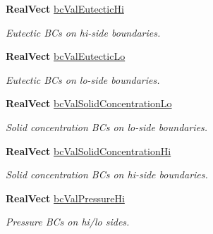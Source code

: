 \begin{DoxyCompactItemize}
\mbox{\label{class_mushy_layer_params_a902bc54e365a674dfb832981ffe4c105}} 
\textbf{ Real\+Vect} \hyperlink{class_mushy_layer_params_a902bc54e365a674dfb832981ffe4c105}{bc\+Val\+Eutectic\+Hi}
\begin{DoxyCompactList}\small\item\em Eutectic B\+Cs on hi-\/side boundaries. \end{DoxyCompactList}\item 
\mbox{\label{class_mushy_layer_params_a7b5ccdd2995d371414f37d7b4817e6b2}} 
\textbf{ Real\+Vect} \hyperlink{class_mushy_layer_params_a7b5ccdd2995d371414f37d7b4817e6b2}{bc\+Val\+Eutectic\+Lo}
\begin{DoxyCompactList}\small\item\em Eutectic B\+Cs on lo-\/side boundaries. \end{DoxyCompactList}\item 
\mbox{\label{class_mushy_layer_params_a6a4304fd045912277d4ddfcbe4fa1736}} 
\textbf{ Real\+Vect} \hyperlink{class_mushy_layer_params_a6a4304fd045912277d4ddfcbe4fa1736}{bc\+Val\+Solid\+Concentration\+Lo}
\begin{DoxyCompactList}\small\item\em Solid concentration B\+Cs on lo-\/side boundaries. \end{DoxyCompactList}\item 
\mbox{\label{class_mushy_layer_params_a38066e836e93647e50557ffa9fa5b8bd}} 
\textbf{ Real\+Vect} \hyperlink{class_mushy_layer_params_a38066e836e93647e50557ffa9fa5b8bd}{bc\+Val\+Solid\+Concentration\+Hi}
\begin{DoxyCompactList}\small\item\em Solid concentration B\+Cs on hi-\/side boundaries. \end{DoxyCompactList}\item 
\textbf{ Real\+Vect} \hyperlink{class_mushy_layer_params_a2a636c632d746bcdbe7f29c0b70c50d2}{bc\+Val\+Pressure\+Hi}
\begin{DoxyCompactList}\small\item\em Pressure B\+Cs on hi/lo sides. \end{DoxyCompactList}\item 
\mbox{\label{class_mushy_layer_params_ac1b2a3539ae1d6b7d716d3796ca221db}} 

\end{DoxyCompactItemize}

